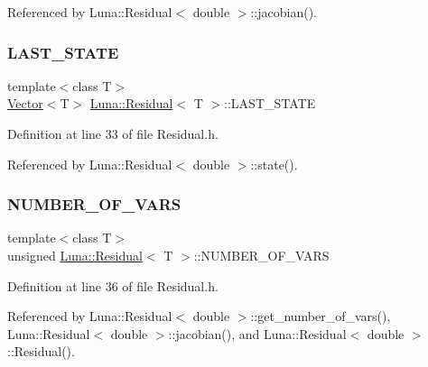 Referenced by Luna\+::\+Residual$<$ double $>$\+::jacobian().

\mbox{\label{classLuna_1_1Residual_abcfc99f00aa4cf3616b32dfd5315dece}} 
\subsubsection{\texorpdfstring{L\+A\+S\+T\+\_\+\+S\+T\+A\+TE}{LAST\_STATE}}
{\footnotesize\ttfamily template$<$class T$>$ \\
\hyperlink{classLuna_1_1Vector}{Vector}$<$T$>$ \hyperlink{classLuna_1_1Residual}{Luna\+::\+Residual}$<$ T $>$\+::L\+A\+S\+T\+\_\+\+S\+T\+A\+TE\hspace{0.3cm}{\ttfamily [protected]}}



Definition at line 33 of file Residual.\+h.



Referenced by Luna\+::\+Residual$<$ double $>$\+::state().

\mbox{\label{classLuna_1_1Residual_a8e7a52a94a49d900ba2784e621a35668}} 
\subsubsection{\texorpdfstring{N\+U\+M\+B\+E\+R\+\_\+\+O\+F\+\_\+\+V\+A\+RS}{NUMBER\_OF\_VARS}}
{\footnotesize\ttfamily template$<$class T$>$ \\
unsigned \hyperlink{classLuna_1_1Residual}{Luna\+::\+Residual}$<$ T $>$\+::N\+U\+M\+B\+E\+R\+\_\+\+O\+F\+\_\+\+V\+A\+RS\hspace{0.3cm}{\ttfamily [protected]}}



Definition at line 36 of file Residual.\+h.



Referenced by Luna\+::\+Residual$<$ double $>$\+::get\+\_\+number\+\_\+of\+\_\+vars(), Luna\+::\+Residual$<$ double $>$\+::jacobian(), and Luna\+::\+Residual$<$ double $>$\+::\+Residual().

